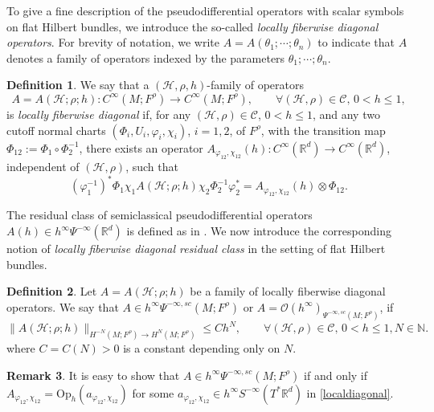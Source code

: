 \documentclass[11pt,oneside,reqno]{amsart}
\newcommand\R{\ensuremath{\mathbb{R}}}
\newcommand\Oph{\ensuremath{\mathrm{Op}_h}}
\theoremstyle{definition}
\newtheorem{definition}{Definition}[section]
\newtheorem{remark}[definition]{Remark}
\numberwithin{equation}{section}
\theoremstyle{plain}
\begin{document}
To give a fine description of the pseudodifferential operators with scalar symbols on flat Hilbert bundles, we introduce the so-called \emph{locally fiberwise diagonal operators}. For brevity of notation, we write $A = A(\theta_1;\cdots;\theta_n)$ to indicate that $A$ denotes a family of operators indexed by the parameters $\theta_1;\cdots;\theta_n$.

\begin{definition}\label{localdiag}
We say that a $(\mathcal{H},\rho,h)$-family of operators 
\begin{equation*}
     A = A(\mathcal{H};\rho;h) : C^{\infty}(M;F^{\rho}) \to C^\infty(M;F^{\rho}) , \qquad \forall  (\mathcal{H},\rho) \in \mathcal{C},\, 0<h\leq 1,
\end{equation*}
is \emph{locally fiberwise diagonal} if, for any $(\mathcal{H},\rho) \in \mathcal{C}$, $0<h\leq 1$, and any two cutoff normal charts $(\Phi_i,U_i,\varphi_i,\chi_i)$, $i=1,2$, of $F^\rho$, with the transition map $\Phi_{12}:=\Phi_1\circ \Phi_{2}^{-1}$, there exists an operator $A_{\varphi_{12},\chi_{12}}(h): C^{\infty}(\mathbb R^d)\to C^{\infty}(\mathbb R^d)$, independent of $(\mathcal{H},\rho)$, such that
\begin{equation}\label{localdiagonal}
(\varphi^{-1}_1)^{*}\Phi_1\chi_1 A(\mathcal{H};\rho;h) \chi_2\Phi^{-1}_2\varphi^{*}_2
= A_{\varphi_{12},\chi_{12}} (h) \otimes \Phi_{12}.
\end{equation}
\end{definition}



The residual class of semiclassical pseudodifferential operators $A(h)\in h^{\infty}\Psi^{-\infty}(\R^d)$ is defined as in \cite[Definition E.11]{dyatlovzworski2019resonances}. We now introduce the corresponding notion of \emph{locally fiberwise diagonal residual class} in the setting of flat Hilbert bundles.




\begin{definition}\label{residualclass}
Let $A=A(\mathcal{H};\rho;h)$ be a family of locally fiberwise diagonal operators. We say that $A \in h^{\infty}\Psi^{-\infty,sc}(M;F^\rho)$ or $A=\mathcal{O}(h^{\infty})_{\Psi^{-\infty,sc}(M;F^\rho)}$, if
\begin{equation}\label{smoothsobolevnorm}
\|A(\mathcal{H};\rho;h)\|_{H^{-N}(M;F^{\rho})\to H^{N}(M;F^{\rho})} \leq C h^N, \qquad \forall (\mathcal{H},\rho) \in \mathcal{C},\, 0<h\leq 1,N \in \mathbb{N}.
\end{equation}
where $C=C(N)>0$ is a constant depending only on $N$. 
\end{definition}
\begin{remark}\label{remark46}
    It is easy to show that $A  \in h^{\infty}\Psi^{-\infty,sc}(M;F^\rho)$ if and only if $A_{\varphi_{12},\chi_{12}} = \Oph(a_{\varphi_{12},\chi_{12}})$ for some $a_{\varphi_{12},\chi_{12}} \in h^\infty S^{-\infty}(T^*\R^d)$ in \eqref{localdiagonal}.
\end{remark}
\end{document}
